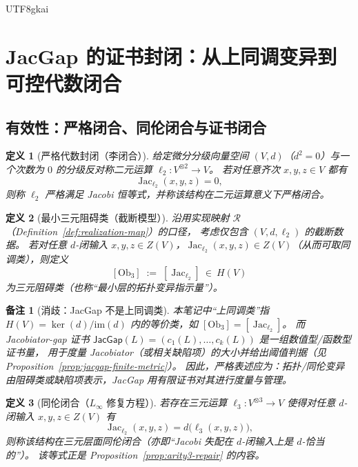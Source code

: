 \documentclass[12pt]{article}
\newtheorem{definition}{定义}[section]
\newtheorem{remark}{备注}[section]
\newcommand{\Layer}{\ensuremath{\ell}}
\newcommand{\Jac}{\operatorname{Jac}}
\newcommand{\Ob}{\mathrm{Ob}}
\newcommand{\JacGap}{\ensuremath{\mathsf{JacGap}}}
\begin{document}
\begin{CJK*}{UTF8}{gkai}
\section{JacGap 的证书封闭：从上同调变异到可控代数闭合}
\label{sec:jacgap-certificate-closure}

\subsection{有效性：严格闭合、同伦闭合与证书闭合}

\begin{definition}[严格代数封闭（李闭合）]
\label{def:strict-lie-closure}
给定微分分级向量空间 $(V,d)$（$d^2=0$）与一个次数为 $0$ 的分级反对称二元运算 $\Layer_2:V^{\otimes 2}\to V$。
若对任意齐次 $x,y,z\in V$ 都有
\[
  \Jac_{\Layer_2}(x,y,z)=0,
\]
则称 $\Layer_2$ \emph{严格满足 Jacobi 恒等式}，并称该结构在二元运算意义下\emph{严格闭合}。
\end{definition}

\begin{definition}[最小三元阻碍类（截断模型）]
\label{def:minimal-obstruction-class}
沿用实现映射 $\mathcal{R}$（Definition~\ref{def:realization-map}）的口径，
考虑仅包含 $(V,d,\Layer_2)$ 的截断数据。
若对任意 $d$-闭输入 $x,y,z\in Z(V)$，$\Jac_{\Layer_2}(x,y,z)\in Z(V)$（从而可取同调类），则定义
\[
  [\Ob_3]
  \;:=\;
  [\Jac_{\Layer_2}]
  \ \in\ H(V)
\]
为\emph{三元阻碍类}（也称“最小层的拓扑变异指示量”）。
\end{definition}

\begin{remark}[消歧：JacGap 不是上同调类]
本笔记中“上同调类”指 $H(V)=\ker(d)/\mathrm{im}(d)$ 内的等价类，如 $[\Ob_3]=[\Jac_{\Layer_2}]$。
而 Jacobiator-gap 证书 $\JacGap(L)=(c_1(L),\dots,c_k(L))$ 是一组\emph{数值型/函数型证书量}，
用于度量 Jacobiator（或相关缺陷项）的大小并给出阈值判据（见 Proposition~\ref{prop:jacgap-finite-metric}）。
因此，严格表述应为：\emph{拓扑/同伦变异由阻碍类或缺陷项表示，JacGap 用有限证书对其进行度量与管理。}
\end{remark}

\begin{definition}[同伦闭合（$L_\infty$ 修复方程）]
\label{def:homotopy-closure}
若存在三元运算 $\Layer_3:V^{\otimes 3}\to V$ 使得对任意 $d$-闭输入 $x,y,z\in Z(V)$ 有
\[
  \Jac_{\Layer_2}(x,y,z)=d\bigl(\Layer_3(x,y,z)\bigr),
\]
则称该结构在三元层面\emph{同伦闭合}（亦即“Jacobi 失配在 $d$-闭输入上是 $d$-恰当的”）。
该等式正是 Proposition~\ref{prop:arity3-repair} 的内容。
\end{definition}


\end{CJK*}
\end{document}
